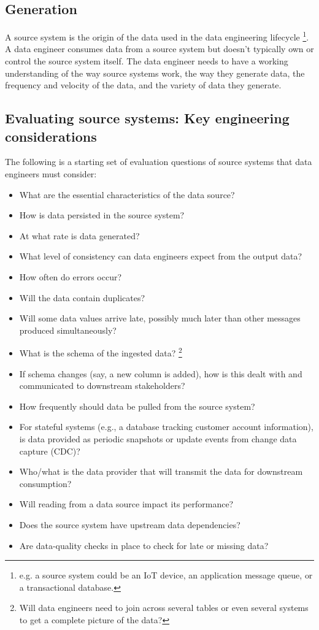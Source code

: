 





\subsection{Generation}
A source system is the origin of the data used in the data engineering
lifecycle
\footnote{
    e.g. a source system could be an IoT device, an application message
    queue, or  a transactional database.
}.
A data engineer consumes data from a source system but doesn't
typically own or control the source system itself. The data engineer
needs to have a working understanding of the way source systems work,
the way they generate data, the frequency and velocity of the data,
and the variety of data they generate.

\subsection*{Evaluating source systems: Key engineering considerations}
The following is a starting set of evaluation questions of source systems
that data engineers must consider:
\begin{itemize}
    \item What are the essential characteristics of the data source?
    \item How is data persisted in the source system?
    \item At what rate is data generated?
    \item What level of consistency can data engineers expect from
    the output data?
    \item How often do errors occur?
    \item Will the data contain duplicates?
    \item Will some data values arrive late, possibly much later
    than other messages produced simultaneously?
    \item What is the schema of the ingested data?
    \footnote{
        Will data engineers need to join across several tables or
        even several systems to get a complete picture of the data?
    }
    \item If schema changes (say, a new column is added), how is this
    dealt with and  communicated to downstream stakeholders?
    \item How frequently should data be pulled from the source system?
    \item For stateful systems (e.g., a database tracking customer
    account information), is  data provided as periodic snapshots or
    update events from change data capture (CDC)?
    \item Who/what is the data provider that will transmit the data
    for downstream consumption?
    \item Will reading from a data source impact its performance?
    \item Does the source system have upstream data dependencies?
    \item Are data-quality checks in place to check for late or
    missing data?
\end{itemize}





